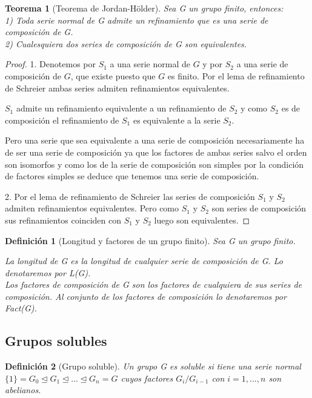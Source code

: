 \documentclass{article}
\theoremstyle{theorem-style}  %
\newtheorem{theorem}{Teorema}[section]  %
\theoremstyle{definition-style}
\newtheorem{definition}{Definición}[section]
\theoremstyle{example-style}
\begin{document}
\begin{theorem}[Teorema de Jordan-Hölder]
Sea G un grupo finito, entonces:\\
1) Toda serie normal de G admite un refinamiento que es una serie de composición de G.\\
2) Cualesquiera dos series de composición de G son equivalentes.
\end{theorem}
\begin{proof}
1. Denotemos por $S_1$ a una serie normal de $G$ y por $S_2$ a una serie de composición de $G$, que existe puesto que $G$ es finito. Por el lema de refinamiento de Schreier ambas series admiten refinamientos equivalentes. 

$S_1$ admite un refinamiento equivalente a un refinamiento de $S_2$ y como $S_2$ es de composición el refinamiento de $S_1$ es equivalente a la serie $S_2$.

Pero una serie que sea equivalente a una serie de composición necesariamente ha de ser una serie de composición ya que los factores de ambas series salvo el orden son isomorfos y como los de la serie de composición son simples por la condición de factores simples se deduce que tenemos una serie de composición.

2. Por el lema de refinamiento de Schreier las series de composición $S_1$ y $S_2$ admiten refinamientos equivalentes. Pero como $S_1$ y $S_2$ son series de composición sus refinamientos coinciden con $S_1$ y $S_2$ luego son equivalentes.
\end{proof}

\begin{definition}[Longitud y factores de un grupo finito]
Sea G un grupo finito.

La longitud de G es la longitud de cualquier serie de composición de G. Lo denotaremos por L(G).\\
Los factores de composición de G son los factores de cualquiera de sus series de composición. Al conjunto de los factores de composición lo denotaremos por Fact(G).
\end{definition}

\subsection{Grupos solubles}

\begin{definition}[Grupo soluble]
Un grupo G es soluble si tiene una serie normal $\{1\} = G_0 \trianglelefteq G_1 \trianglelefteq ... \trianglelefteq G_n = G$ cuyos factores $G_i/G_{i-1}$ con $i=1,...,n$ son abelianos.
\end{definition}
\end{document}
